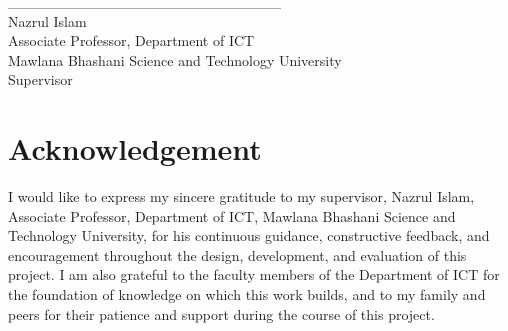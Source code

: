 \documentclass[12pt,a4paper]{report}
\begin{document}
\vspace{3.5cm}
\noindent
\_\_\_\_\_\_\_\_\_\_\_\_\_\_\_\_\_\_\_\_\_\_\_\_\_\_\\
Nazrul Islam\\
Associate Professor, Department of ICT\\
Mawlana Bhashani Science and Technology University\\
Supervisor

\chapter*{Acknowledgement}
I would like to express my sincere gratitude to my supervisor, Nazrul Islam, Associate Professor,
Department of ICT, Mawlana Bhashani Science and Technology University, for his continuous guidance,
constructive feedback, and encouragement throughout the design, development, and evaluation of this
project. I am also grateful to the faculty members of the Department of ICT for the foundation of
knowledge on which this work builds, and to my family and peers for their patience and support during the
course of this project.

\end{document}
